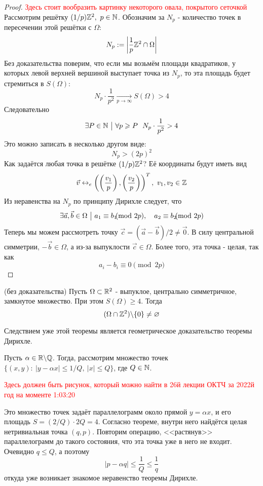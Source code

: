 \begin{proof}
	\textcolor{red}{Здесь стоит вообразить картинку некоторого овала, покрытого сеточкой}
	Рассмотрим решётку $(1/p)\mathbb{Z}^2,\ p \in \mathbb{N}$. Обозначим за $N_p$ - количество точек в пересечении этой решётки с $\Omega$:
	\[
		N_p := \left|\frac{1}{p}\mathbb{Z}^2 \cap \Omega\right|
	\]
	Без доказательства поверим, что если мы возьмём площади квадратиков, у которых левой верхней вершиной выступает точка из $N_p$, то эта площадь будет стремиться в $S(\Omega)$:
	\[
		N_p \cdot \frac{1}{p^2} \xrightarrow[p \to \infty]{} S(\Omega) > 4
	\]
	Следовательно
	\[
		\exists P \in \mathbb{N} \ \big|\  \forall p \geqslant P\ \ N_p \cdot \frac{1}{p^2} > 4
	\]
	Это можно записать в несколько другом виде:
	\[
		N_p > (2p)^2
	\]
	Как задаётся любая точка в решётке $(1/p)\mathbb{Z}^2$? Её координаты будут иметь вид
	\[
		\vec{v} \leftrightarrow_e \left(\left(\frac{v_1}{p}\right), \left(\frac{v_2}{p}\right)\right)^T,\ v_1, v_2 \in \Z
	\]
	Из неравенства на $N_p$ по принципу Дирихле следует, что
	\[
		\exists \vec{a}, \vec{b} \in \Omega \such a_1 \equiv b_1\!\!\!\! \pmod {2p},\quad a_2 \equiv b_2\!\!\!\! \pmod {2p}
	\]
	Теперь мы можем рассмотреть точку $\vec{c} = (\vec{a} - \vec{b}) / 2 \neq \vec{0}$. В силу центральной симметрии, $-\vec{b} \in \Omega$, а из-за выпуклости $\vec{c} \in \Omega$. Более того, эта точка - целая, так как
	\[
		a_i - b_i \equiv 0 \pmod {2p}
	\]
\end{proof}

\begin{theorem} (без доказательства)
	Пусть $\Omega \subset \mathbb{R}^2$ - выпуклое, центрально симметричное, замкнутое множество. При этом $S(\Omega) \ge 4$. Тогда
	\[
		(\Omega \cap \mathbb{Z}^2) \backslash \{0\} \neq \varnothing
	\]
\end{theorem}

\begin{corollary}
	Следствием уже этой теоремы является геометрическое доказательство теоремы Дирихле.
	
	Пусть $\alpha \in \mathbb{R} \backslash \mathbb{Q}$. Тогда, рассмотрим множество точек $\{(x, y) \colon\ |y - \alpha x| \le 1 / Q,\ |x| \le Q\}$, где $Q \in \mathbb{N}$.
	
	\textcolor{red}{Здесь должен быть рисунок, который можно найти в 26й лекции ОКТЧ за 2022й год на моменте 1:03:20}
	
	Это множество точек задаёт параллелограмм около прямой $y = \alpha x$, и его площадь $S = (2 / Q) \cdot 2Q = 4$. Согласно теореме, внутри него найдётся целая нетривиальная точка $(q, p)$. Повторим операцию, <<растянув>> параллелограмм до такого состояния, что эта точка уже в него не входит. Очевидно $q \le Q$, а поэтому
	\[
		|p - \alpha q| \le \frac{1}{Q} \le \frac{1}{q}
	\]
	откуда уже возникает знакомое неравенство теоремы Дирихле.
\end{corollary}

